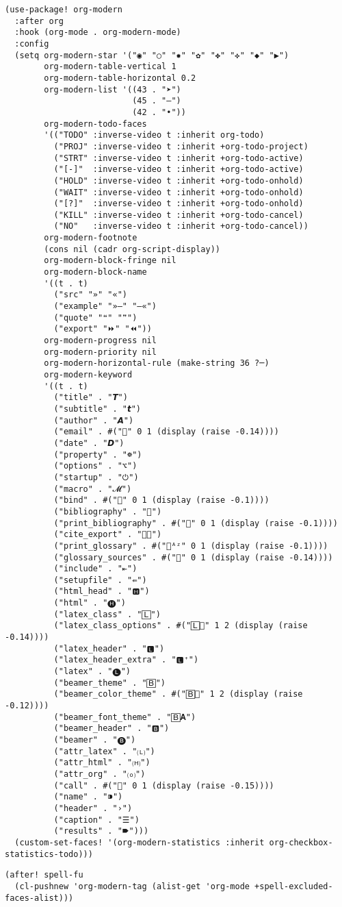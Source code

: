 \documentclass[c]{article}
\theoremstyle{plain}%
\theoremstyle{definition}
\theoremstyle{remark}
\begin{document}
\begin{verbatim}
(use-package! org-modern
  :after org
  :hook (org-mode . org-modern-mode)
  :config
  (setq org-modern-star '("◉" "○" "✸" "✿" "✤" "✜" "◆" "▶")
        org-modern-table-vertical 1
        org-modern-table-horizontal 0.2
        org-modern-list '((43 . "➤")
                          (45 . "–")
                          (42 . "•"))
        org-modern-todo-faces
        '(("TODO" :inverse-video t :inherit org-todo)
          ("PROJ" :inverse-video t :inherit +org-todo-project)
          ("STRT" :inverse-video t :inherit +org-todo-active)
          ("[-]"  :inverse-video t :inherit +org-todo-active)
          ("HOLD" :inverse-video t :inherit +org-todo-onhold)
          ("WAIT" :inverse-video t :inherit +org-todo-onhold)
          ("[?]"  :inverse-video t :inherit +org-todo-onhold)
          ("KILL" :inverse-video t :inherit +org-todo-cancel)
          ("NO"   :inverse-video t :inherit +org-todo-cancel))
        org-modern-footnote
        (cons nil (cadr org-script-display))
        org-modern-block-fringe nil
        org-modern-block-name
        '((t . t)
          ("src" "»" "«")
          ("example" "»–" "–«")
          ("quote" "❝" "❞")
          ("export" "⏩" "⏪"))
        org-modern-progress nil
        org-modern-priority nil
        org-modern-horizontal-rule (make-string 36 ?─)
        org-modern-keyword
        '((t . t)
          ("title" . "𝙏")
          ("subtitle" . "𝙩")
          ("author" . "𝘼")
          ("email" . #("" 0 1 (display (raise -0.14))))
          ("date" . "𝘿")
          ("property" . "☸")
          ("options" . "⌥")
          ("startup" . "⏻")
          ("macro" . "𝓜")
          ("bind" . #("" 0 1 (display (raise -0.1))))
          ("bibliography" . "")
          ("print_bibliography" . #("" 0 1 (display (raise -0.1))))
          ("cite_export" . "⮭")
          ("print_glossary" . #("ᴬᶻ" 0 1 (display (raise -0.1))))
          ("glossary_sources" . #("" 0 1 (display (raise -0.14))))
          ("include" . "⇤")
          ("setupfile" . "⇚")
          ("html_head" . "🅷")
          ("html" . "🅗")
          ("latex_class" . "🄻")
          ("latex_class_options" . #("🄻" 1 2 (display (raise -0.14))))
          ("latex_header" . "🅻")
          ("latex_header_extra" . "🅻⁺")
          ("latex" . "🅛")
          ("beamer_theme" . "🄱")
          ("beamer_color_theme" . #("🄱" 1 2 (display (raise -0.12))))
          ("beamer_font_theme" . "🄱𝐀")
          ("beamer_header" . "🅱")
          ("beamer" . "🅑")
          ("attr_latex" . "🄛")
          ("attr_html" . "🄗")
          ("attr_org" . "⒪")
          ("call" . #("" 0 1 (display (raise -0.15))))
          ("name" . "⁍")
          ("header" . "›")
          ("caption" . "☰")
          ("results" . "🠶")))
  (custom-set-faces! '(org-modern-statistics :inherit org-checkbox-statistics-todo)))
\end{verbatim}
\begin{verbatim}
(after! spell-fu
  (cl-pushnew 'org-modern-tag (alist-get 'org-mode +spell-excluded-faces-alist)))
\end{verbatim}
\end{document}
